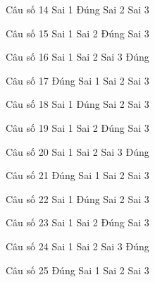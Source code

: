 \begin{ex}
Câu số 14
\choice
{Sai 1}
{\True Đúng}
{Sai 2}
{Sai 3}
\end{ex}

\begin{ex}
Câu số 15
\choice
{Sai 1}
{Sai 2}
{\True Đúng}
{Sai 3}
\end{ex}

\begin{ex}
Câu số 16
\choice
{Sai 1}
{Sai 2}
{Sai 3}
{\True Đúng}
\end{ex}
\begin{ex}
Câu số 17
\choice
{\True Đúng}
{Sai 1}
{Sai 2}
{Sai 3}
\end{ex}

\begin{ex}
Câu số 18
\choice
{Sai 1}
{\True Đúng}
{Sai 2}
{Sai 3}
\end{ex}

\begin{ex}
Câu số 19
\choice
{Sai 1}
{Sai 2}
{\True Đúng}
{Sai 3}
\end{ex}

\begin{ex}
Câu số 20
\choice
{Sai 1}
{Sai 2}
{Sai 3}
{\True Đúng}
\end{ex}
\begin{ex}
Câu số 21
\choice
{\True Đúng}
{Sai 1}
{Sai 2}
{Sai 3}
\end{ex}

\begin{ex}
Câu số 22
\choice
{Sai 1}
{\True Đúng}
{Sai 2}
{Sai 3}
\end{ex}

\begin{ex}
Câu số 23
\choice
{Sai 1}
{Sai 2}
{\True Đúng}
{Sai 3}
\end{ex}

\begin{ex}
Câu số 24
\choice
{Sai 1}
{Sai 2}
{Sai 3}
{\True Đúng}
\end{ex}
\begin{ex}
Câu số 25
\choice
{\True Đúng}
{Sai 1}
{Sai 2}
{Sai 3}
\end{ex}

